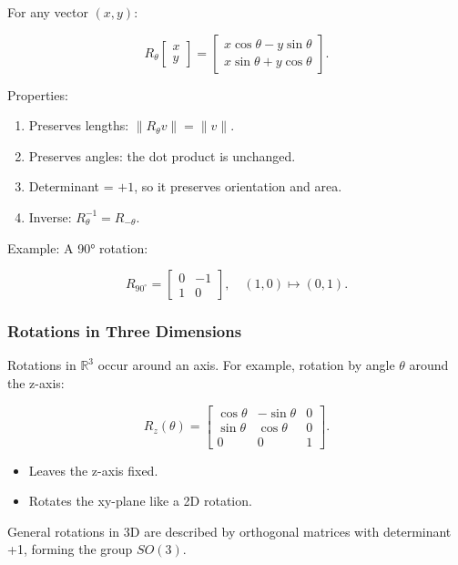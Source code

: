 \documentclass[
  letterpaper,
  DIV=11,
  numbers=noendperiod]{scrreprt}
\providecommand{\tightlist}{%
  \setlength{\itemsep}{0pt}\setlength{\parskip}{0pt}}
\begin{document}
For any vector \((x,y)\):

\[
R_\theta \begin{bmatrix} x \\ y \end{bmatrix} = \begin{bmatrix} x\cos\theta - y\sin\theta \\ x\sin\theta + y\cos\theta \end{bmatrix}.
\]

Properties:

\begin{enumerate}
\def\labelenumi{\arabic{enumi}.}
\tightlist
\item
  Preserves lengths: \(\|R_\theta v\| = \|v\|\).
\item
  Preserves angles: the dot product is unchanged.
\item
  Determinant = \(+1\), so it preserves orientation and area.
\item
  Inverse: \(R_\theta^{-1} = R_{-\theta}\).
\end{enumerate}

Example: A 90° rotation:

\[
R_{90^\circ} = \begin{bmatrix} 0 & -1 \\ 1 & 0 \end{bmatrix}, \quad (1,0) \mapsto (0,1).
\]

\subsubsection{Rotations in Three
Dimensions}\label{rotations-in-three-dimensions}

Rotations in \(\mathbb{R}^3\) occur around an axis. For example,
rotation by angle \(\theta\) around the z-axis:

\[
R_z(\theta) = \begin{bmatrix} \cos\theta & -\sin\theta & 0 \\ \sin\theta & \cos\theta & 0 \\ 0 & 0 & 1 \end{bmatrix}.
\]

\begin{itemize}
\tightlist
\item
  Leaves the z-axis fixed.
\item
  Rotates the xy-plane like a 2D rotation.
\end{itemize}

General rotations in 3D are described by orthogonal matrices with
determinant +1, forming the group \(SO(3)\).
\end{document}
